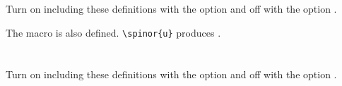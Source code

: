 \newpage
\section{}

Turn on including these definitions with the option  and off with the option .



\noindent The macro  is also defined.
\verb|\spinor{u}| produces .


\newpage
\section{}

Turn on including these definitions with the option  and off with the option .


